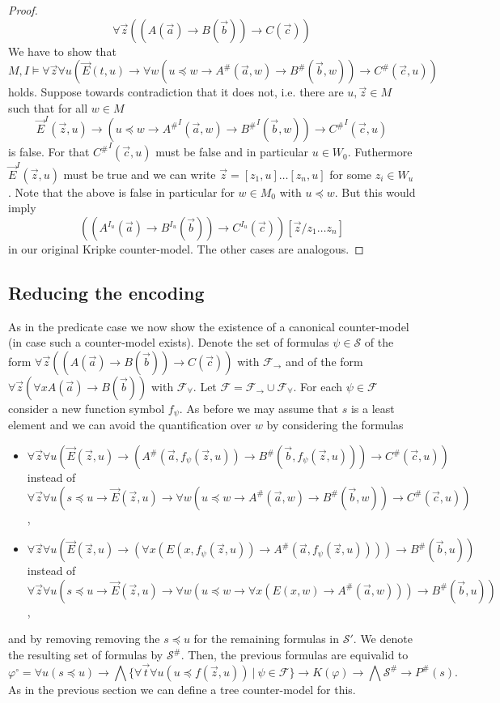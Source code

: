 \documentclass[a4paper,11pt]{report}
\theoremstyle{definition}
\theoremstyle{definition}
\theoremstyle{definition}
\theoremstyle{definition}
\theoremstyle{definition}
\theoremstyle{definition}
\theoremstyle{definition}
\begin{document}
\begin{proof}
		$$ \forall \vec z((A(\vec a)\to B(\vec b))\to C(\vec c))$$
		We have to show that
		$$M, I\models \forall \vec z\forall u(\vec E(t, u)\to \forall w(u\preceq w\to A^\#(\vec a, w)\to B^\#(\vec b, w))\to C^\#(\vec c, u))$$
		holds. Suppose towards contradiction that it does not, i.e. there are $u, \vec z\in M$ such that for all $w\in M$
		$$\vec E^I(\vec z, u)\to (u\preceq w\to {A^\#}^I(\vec a, w)\to {B^\#}^I(\vec b, w))\to {C^\#}^I(\vec c, u)$$ is false. For that ${C^\#}^I(\vec c, u)$ must be false and in particular $u\in W_0$. Futhermore $\vec E^I(\vec z, u)$ must be true and we can write $\vec z = [z_1, u]\dots[z_n, u]$ for some $z_i\in W_u$. Note that the above is false in particular for $w\in M_0$ with $u\preceq w$. But this would imply
		$$((A^{I_u}(\vec a)\to B^{I_u}(\vec b))\to C^{I_u}(\vec c))[\vec z/z_1\dots z_n]$$in our original Kripke counter-model. The other cases are analogous.
	\end{proof}
	
	\subsection{Reducing the encoding}
	
	As in the predicate case we now show the existence of a canonical counter-model (in case such a counter-model exists). Denote the set of formulas $\psi\in\mathcal S$ of the form $\forall\vec z((A(\vec a)\to B(\vec b))\to C(\vec c))$ with $\mathcal F_\to$ and of the form $\forall \vec z(\forall xA(\vec a)\to B(\vec b))$ with $\mathcal F_\forall$. Let $\mathcal F = \mathcal F_\to\cup\mathcal F_\forall$. For each  $\psi\in\mathcal F$ consider a new function symbol $f_\psi$. As before we may assume that $s$ is a least element and we can avoid the quantification over $w$ by considering the formulas
	\begin{itemize}
		\item $\forall \vec z\forall u(\vec E(\vec z, u)\to (A^\#(\vec a, f_\psi(\vec z, u))\to B^\#(\vec b, f_\psi(\vec z, u)))\to C^\#(\vec c, u))$\\instead of $\forall \vec z\forall u(s\preceq u\to\vec E(\vec z, u)\to \forall w(u\preceq w\to A^\#(\vec a, w)\to B^\#(\vec b, w))\to C^\#(\vec c, u))$,
		\item $\forall \vec z\forall u(\vec E(\vec z, u)\to (\forall x(E(x, f_\psi(\vec z, u))\to A^\#(\vec a, f_\psi(\vec z, u))))\to B^\#(\vec b, u))$\\instead of $\forall \vec z\forall u(s\preceq u\to\vec E(\vec z, u)\to \forall w(u\preceq w\to \forall x(E(x, w)\to A^\#(\vec a, w)))\to B^\#(\vec b, u))$,
	\end{itemize}
	and by removing removing the $s\preceq u$ for the remaining formulas in $\mathcal S'$.
	We denote the resulting set of formulas by $\mathcal S^\#$.
	Then, the previous formulas are equivalid to
	$$\varphi^\circ= \forall u(s\preceq u)\to \bigwedge\{\forall \vec t\forall u(u\preceq f(\vec z, u))\:|\:\psi\in\mathcal F\}\to K(\varphi)\to\bigwedge\mathcal S^\#\to P^\#(s).$$
	As in the previous section we can define a tree counter-model for this.
	
\end{document}
